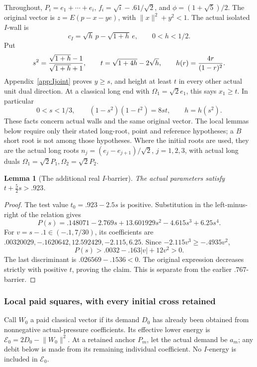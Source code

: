 \documentclass[11pt]{article}
\newtheorem{lemma}[theorem]{Lemma}
\theoremstyle{definition}
\theoremstyle{remark}
\newcommand{\norm}[1]{\lVert #1\rVert}
\begin{document}
Throughout, \(P_i=e_1+\cdots+e_i\),
\(f_i=\sqrt i-.61/\sqrt2\), and \(\phi=(1+\sqrt5)/2\).
The original vector is \(z=E(p-x-ye)\), with
\(\norm x^2+y^2<1\). The actual isolated \(I\)-wall is
\[
 c_I=\sqrt h\,p-\sqrt{1+h}\,e,\qquad 0<h<1/2.
\]
Put
\[
 s^2={\sqrt{1+h}-1\over\sqrt{1+h}+1},\qquad
 t=\sqrt{1+4h}-2\sqrt h,\qquad h(r)={4r\over(1-r)^2}.
\]
Appendix~\ref{app:Ijoint} proves \(y\ge s\), and height at least
\(t\) in every other actual unit dual direction. At a classical long
end with \(\Omega_1=\sqrt2e_1\), this says \(x_1\ge t\).
In particular
\[
 0<s<1/3,\qquad (1-s^2)(1-t^2)=8st,\qquad h=h(s^2).
\]
These facts concern actual walls and the same original vector.
The local lemmas below require only their stated long-root, point and
reference hypotheses; a \(B\) short root is not among those hypotheses.
Where the initial roots are used, they are the actual long roots
\(n_j=(e_j-e_{j+1})/\sqrt2\), \(j=1,2,3\), with actual
long duals \(\Omega_1=\sqrt2P_1,\Omega_2=\sqrt2P_2\).

\begin{lemma}[The additional real \(I\)-barrier]
\label{lem:I923-real-barrier}
The actual parameters satisfy \(t+\tfrac52s>.923\).
\end{lemma}
\begin{proof}
The test value \(t_0=.923-2.5s\) is positive. Substitution in the
left-minus-right of the relation gives
\[
 P(s)=.148071-2.769s+13.601929s^2-4.615s^3+6.25s^4.
\]
For \(v=s-.1\in(-.1,7/30)\), its coefficients are
\(.00320029,-.1620642,12.592429,-2.115,6.25\).
Since \(-2.115v^3\ge-.4935v^2\),
\[
 P(s)>.0032-.163|v|+12v^2>0.
\]
The last discriminant is \(.026569-.1536<0\). The original
expression decreases strictly with positive \(t\), proving the claim.
This is separate from the earlier \(.767\)-barrier.
\end{proof}

\subsubsection{Local paid squares, with every initial cross retained}
Call \(W_0\) a paid classical vector if its demand \(D_0\) has already
been obtained from nonnegative actual-pressure coefficients. Its effective
lower energy is \(\mathcal E_0=2D_0-\norm{W_0}^2\).
At a retained anchor \(P_m\), let the actual demand be \(a_m\);
any debit below is made from its remaining individual coefficient.
No \(I\)-energy is included in \(\mathcal E_0\).
\end{document}
